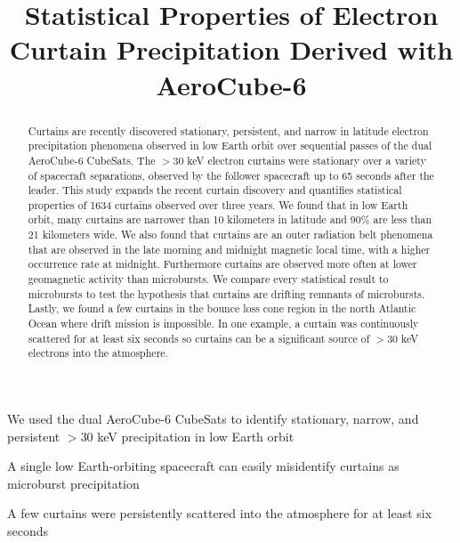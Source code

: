 \documentclass[draft]{agujournal2019}
\begin{document}
\title{Statistical Properties of Electron Curtain Precipitation Derived with AeroCube-6}

%
%





\begin{keypoints}
\item We used the dual AeroCube-6 CubeSats to identify stationary, narrow, and persistent $>30$ keV precipitation in low Earth orbit
\item A single low Earth-orbiting spacecraft can easily misidentify curtains as microburst precipitation
\item A few curtains were persistently scattered into the atmosphere for at least six seconds
\end{keypoints}


\begin{abstract}
Curtains are recently discovered stationary, persistent, and narrow in latitude electron precipitation phenomena observed in low Earth orbit over sequential passes of the dual AeroCube-6 CubeSats. The $> 30$ keV electron curtains were stationary over a variety of spacecraft separations, observed by the follower spacecraft up to 65 seconds after the leader. This study expands the recent curtain discovery and quantifies statistical properties of 1634 curtains observed over three years. We found that in low Earth orbit, many curtains are narrower than 10 kilometers in latitude and 90\% are less than 21 kilometers wide. We also found that curtains are an outer radiation belt phenomena that are observed in the late morning and midnight magnetic local time, with a higher occurrence rate at midnight. Furthermore curtains are observed more often at lower geomagnetic activity than microbursts.  We compare every statistical result to microbursts to test the hypothesis that curtains are drifting remnants of microbursts. Lastly, we found a few curtains in the bounce loss cone region in the north Atlantic Ocean where drift mission is impossible. In one example, a curtain was continuously scattered for at least six seconds so curtains can be a significant source of $> 30$ keV electrons into the atmosphere.
\end{abstract}
\end{document}
